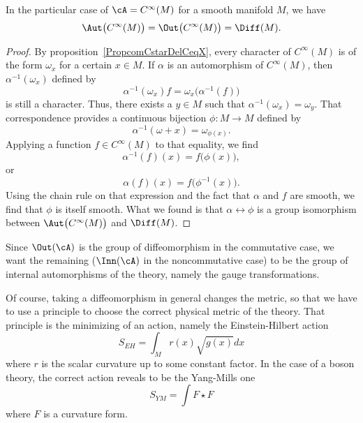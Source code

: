 \begin{proposition}
In the particular case of $\cA= C^{\infty}(M)$ for a smooth manifold $M$, we have
\[
  \Aut\big(  C^{\infty}(M) \big)=\Out\big(  C^{\infty}(M) \big)=\Diff(M).
\]
\end{proposition}

\begin{proof}

By proposition~\ref{PropcomCstarDelCeqX}, every character of $ C^{\infty}(M)$ is of the form $\omega_x$ for a certain $x\in M$. If $\alpha$ is an automorphism of $ C^{\infty}(M)$, then $\alpha^{-1}(\omega_x)$ defined by
\[
  \alpha^{-1}(\omega_x)f=\omega_x\big( \alpha^{-1}(f) \big)
\]
is still a character. Thus, there exists a $y\in M$ such that $\alpha^{-1}(\omega_x)=\omega_y$. That correspondence provides a continuous bijection $\phi\colon M\to M$ defined by
\[
  \alpha^{-1}(\omega+x)=\omega_{\phi(x)}.
\]
Applying a function $f\in C^{\infty}(M)$ to that equality, we find
\[
  \alpha^{-1}(f)(x)=f\big( \phi(x) \big),
\]
or
\begin{equation}
\alpha(f)(x)=f\big( \phi^{-1}(x) \big).
\end{equation}
Using the chain rule on that expression and the fact that $\alpha$ and $f$ are smooth, we find that $\phi$ is itself smooth. What we found is that $\alpha\leftrightarrow \phi$ is a group isomorphism between $\Aut\big(  C^{\infty}(M) \big)$ and $\Diff(M)$.
\end{proof}

Since $\Out(\cA)$ is the group of diffeomorphism in the commutative case, we want the remaining ($\Inn(\cA)$ in the noncommutative case) to be the group of internal automorphisms of the theory, namely the gauge transformations.

Of course, taking a diffeomorphism in general changes the metric, so that we have to use a principle to choose the correct physical metric of the theory. That principle is the minimizing of an action, namely the Einstein-Hilbert action
\[
  S_{EH}=\int_Mr(x)\sqrt{g(x)}dx
\]
where $r$ is the scalar curvature up to some constant factor. In the case of a boson theory, the correct action reveals to be the Yang-Mills one
\[
  S_{YM}=\int F\star F
\]
where $F$ is a curvature form.

